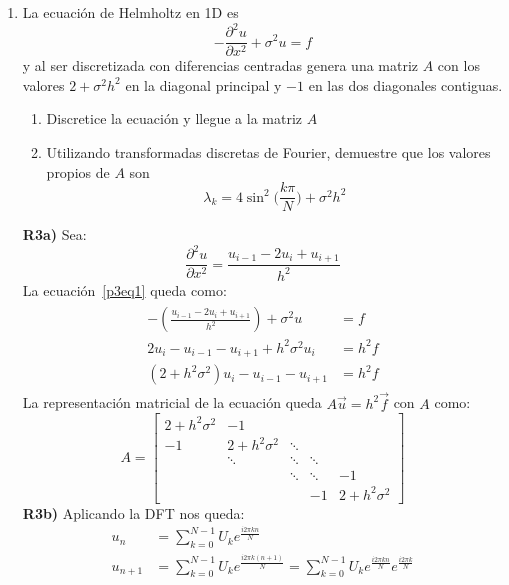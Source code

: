\documentclass{article}
\begin{document}
\begin{enumerate}
    
    \item La ecuación de Helmholtz en 1D es
    \begin{equation}\label{p3eq1}
        -\frac{\partial^2u}{\partial x^2} + \sigma^2u=f
    \end{equation}
    y al ser discretizada con diferencias centradas genera una matriz $A$ con los valores $2+\sigma^2 h^2$ en la diagonal principal y $-1$ en las dos diagonales contiguas.
    \begin{enumerate}
        \item Discretice la ecuación y llegue a la matriz $A$
        \item Utilizando transformadas discretas de Fourier, demuestre que los valores propios de $A$ son
        \begin{equation}\label{p3eq2}
            \lambda_k = 4\sin^2\Big(\frac{k\pi}{N}\Big) + \sigma^2h^2
        \end{equation}
    \end{enumerate}
    \textbf{R3a)} Sea:
    $$ \frac{\partial^2u}{\partial x^2} = \frac{u_{i-1}-2u_{i}+u_{i+1}}{h^2} $$
    La ecuación~\ref{p3eq1} queda como:
    \begin{align}\begin{split}\label{r3a}
        -(\frac{u_{i-1}-2u_{i}+u_{i+1}}{h^2}) + \sigma^2u &= f \\
        2u_{i} - u_{i-1} - u_{i+1} + h^2\sigma^2u_{i} &= h^2f \\
        (2+h^2\sigma^2)u_{i} - u_{i-1} - u_{i+1} &= h^2f
    \end{split}\end{align}
    La representación matricial de la ecuación queda $A\vec{u} = h^2\vec{f}$ con $A$ como:
    $$ A =
    \begin{bmatrix}
        2+h^2\sigma^2 & -1 &  &  &  \\
        -1 & 2+h^2\sigma^2 & \ddots &  &  \\
          & \ddots & \ddots & \ddots &  \\
         &  & \ddots & \ddots & -1 \\
         &  &  & -1  & 2+h^2\sigma^2
    \end{bmatrix}
    $$
    \textbf{R3b)} Aplicando la DFT nos queda:
    \begin{align*}
        u_n &= \sum_{k=0}^{N-1} U_ke^{\frac{i2\pi kn}{N}}\\
        u_{n+1} &= \sum_{k=0}^{N-1} U_ke^{\frac{i2\pi k(n+1)}{N}} =
            \sum_{k=0}^{N-1} U_ke^{\frac{i2\pi kn}{N}}e^{\frac{i2\pi k}{N}}\\

\end{align*}
\end{enumerate}
\end{document}
